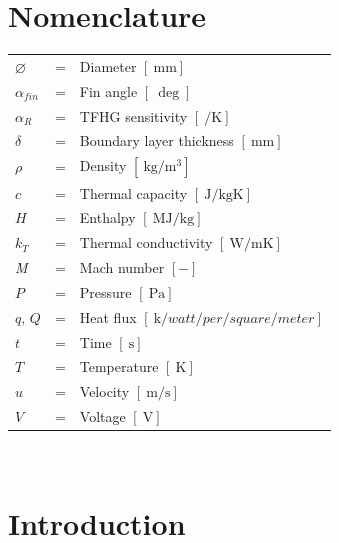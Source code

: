 \documentclass{AIAA}
\begin{document}
\maketitle

 \section*{Nomenclature}
 \noindent\begin{tabular}{@{}lcl@{}}
\textit{$\diameter$}  &=& Diameter $[\SI{}{\milli\meter}]$\\
\textit{$\alpha_{fin}$}  &=& Fin angle $[\SI{}{\deg}]$\\
\textit{$\alpha_R$}  &=& TFHG sensitivity $[\SI{}{\per\kelvin}]$\\
\textit{$\delta$}  &=& Boundary layer thickness $[\SI{}{\milli\meter}]$ \\
\textit{$\rho$}  &=& Density $[\SI{}{\kilo\gram\per\cubic\meter}]$\\
\textit{$c$}  &=& Thermal capacity $[\SI{}{\joule\per\kilo\gram\kelvin}]$ \\
\textit{$H$}  &=& Enthalpy $[\SI{}{\mega\joule\per\kilo\gram}]$\\
\textit{$k_T$}  &=& Thermal conductivity $[\SI{}{\watt\per\meter\kelvin}]$ \\
\textit{M}  &=& Mach number $[-]$\\
\textit{$P$}  &=& Pressure $[\SI{}{\pascal}]$\\
\textit{$q,\,Q$}  &=& Heat flux $[\SI{}{\kilo/watt/per/square/meter}]$\\
\textit{$t$}  &=& Time $[\SI{}{\second}]$\\
\textit{$T$}  &=& Temperature $[\SI{}{\kelvin}]$\\
\textit{$u$}  &=& Velocity $[\SI{}{\meter\per\second}]$ \\
\textit{$V$}  &=& Voltage $[\SI{}{\volt}]$ \\
 \end{tabular} \\


\section{Introduction}
\end{document}
